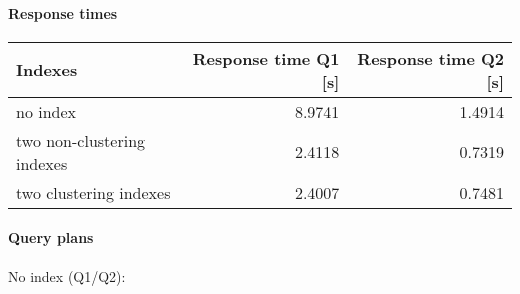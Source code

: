 \documentclass[11pt]{scrartcl}
\begin{document}
\paragraph{Response times}\mbox{}

\begin{table}[H]
  \centering
  \begin{tabular}{l|r|r}
    Indexes & Response time Q1 [s] & Response time Q2 [s] \tabularnewline
    \hline
    no index & 8.9741 & 1.4914 \tabularnewline
    two non-clustering indexes & 2.4118 & 0.7319 \tabularnewline
    two clustering indexes & 2.4007 & 0.7481 \tabularnewline
  \end{tabular}
\end{table}

\paragraph{Query plans}\mbox{}

No index (Q1/Q2):
\end{document}
